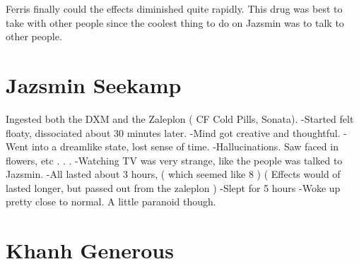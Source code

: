 \documentclass[12pt]{book}
\begin{document}
Ferris finally could the effects diminished quite rapidly. This drug was best to take with other people since the coolest thing to do on Jazsmin was to talk to other people.



\chapter{Jazsmin Seekamp}

Ingested both the DXM and the Zaleplon ( CF Cold Pills, Sonata). -Started felt floaty, dissociated about 30 minutes later. -Mind got creative and thoughtful. -Went into a dreamlike state, lost sense of time. -Hallucinations. Saw faced in flowers, etc . . .  -Watching TV was very strange, like the people was talked to Jazsmin. -All lasted about 3 hours, ( which seemed like 8 ) ( Effects would of lasted longer, but passed out from the zaleplon ) -Slept for 5 hours -Woke up pretty close to normal. A little paranoid though.






\chapter{Khanh Generous}
\end{document}
